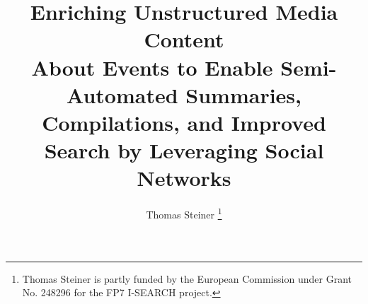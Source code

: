 \documentclass[runningheads,a4paper]{llncs}
\begin{document}
\mainmatter  %

\title{Enriching Unstructured Media Content\\ About Events to Enable Semi-Automated Summaries, Compilations, and Improved\\ Search by Leveraging Social Networks}


\author{Thomas Steiner%
\thanks{Thomas Steiner is partly funded by the European Commission under Grant No. 248296 for the FP7 I-SEARCH project.}}
%

\end{document}
